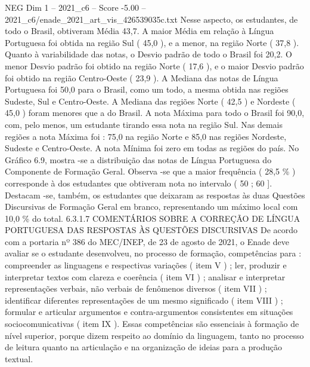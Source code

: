 \begin{textsample}{NEG Dim 1 – 2021\_c6 – Score -5.00 – 2021\_c6/enade\_2021\_art\_vis\_426539035c.txt}
Nesse aspecto, os estudantes, de todo o Brasil, obtiveram Média 43,7.
A maior Média em relação à Língua Portuguesa foi obtida na região Sul ( 45,0 ), e a menor, na região Norte ( 37,8 ).
Quanto à variabilidade das notas, o Desvio padrão de todo o Brasil foi 20,2.
O menor Desvio padrão foi obtido na região Norte ( 17,6 ), e o maior Desvio padrão foi obtido na região Centro-Oeste ( 23,9 ).
A Mediana das notas de Língua Portuguesa foi 50,0 para o Brasil, como um todo, a mesma obtida nas regiões Sudeste, Sul e Centro-Oeste.
A Mediana das regiões Norte ( 42,5 ) e Nordeste ( 45,0 ) foram menores que a do Brasil.
A nota Máxima para todo o Brasil foi 90,0, com, pelo menos, um estudante tirando essa nota na região Sul.
Nas demais regiões a nota Máxima foi : 75,0 na região Norte e 85,0 nas regiões Nordeste, Sudeste e Centro-Oeste.
A nota Mínima foi zero em todas as regiões do país.
No Gráfico 6.9, mostra -se a distribuição das notas de Língua Portuguesa do Componente de Formação Geral.
Observa -se que a maior frequência ( 28,5 \% ) corresponde à dos estudantes que obtiveram nota no intervalo ( 50 ; 60 ].
Destacam -se, também, os estudantes que deixaram as respostas às duas Questões Discursivas de Formação Geral em branco, representando um máximo local com 10,0 \% do total. 6.3.1.7 COMENTÁRIOS SOBRE A CORREÇÃO DE LÍNGUA PORTUGUESA DAS RESPOSTAS ÀS QUESTÕES DISCURSIVAS De acordo com a portaria nº 386 do MEC/INEP, de 23 de agosto de 2021, o Enade deve avaliar se o estudante desenvolveu, no processo de formação, competências para : compreender as linguagens e respectivas variações ( item V ) ; ler, produzir e interpretar textos com clareza e coerência ( item VI ) ; analisar e interpretar representações verbais, não verbais de fenômenos diversos ( item VII ) ; identificar diferentes representações de um mesmo significado ( item VIII ) ; formular e articular argumentos e contra-argumentos consistentes em situações sociocomunicativas ( item IX ).
Essas competências são essenciais à formação de nível superior, porque dizem respeito ao domínio da linguagem, tanto no processo de leitura quanto na articulação e na organização de ideias para a produção textual.

\end{textsample}
